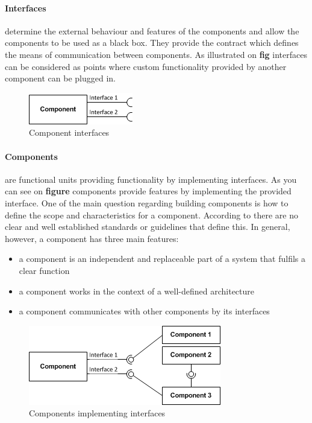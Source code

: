\paragraph{Interfaces}
	determine the external behaviour and features of the components and allow the components to be used as a black box. They provide the contract which defines the means of communication between components. As illustrated on \textbf{fig} interfaces can be considered as points where custom functionality provided by another component can be plugged in. 
	
	\begin{figure}[h!]
  		\centering
  		\includegraphics[scale=0.75]{plug-in/component-interfaces.png}
  		\caption{Component interfaces }
	\end{figure}

\paragraph{Components}
	are functional units providing functionality by implementing interfaces. As you can see on \textbf{figure} components provide  features by implementing the provided interface. One of the main question regarding building components is how to define the scope and characteristics for a component. According to \cite{Cai} there are no clear and well established standards or guidelines that define this. In general, however, a component has three main features: 

\begin{itemize}
	\item a component is an independent and replaceable part of a system that fulfils a clear function
	\item a component works in the context of a well-defined architecture
	\item a component communicates with other components by its interfaces 
\end{itemize}

	\begin{figure}[h!]
  		\centering
  		\includegraphics[scale=0.75]{plug-in/component-services.png}
  		\caption{Components implementing interfaces }
	\end{figure}

